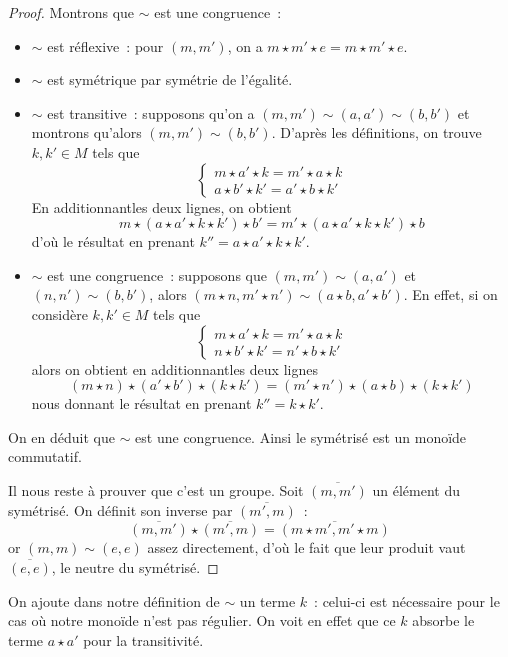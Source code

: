 \begin{proof}
  Montrons que $\sim$ est une congruence~:
  \begin{itemize}
  \item $\sim$ est réflexive~: pour $(m,m')$, on a
    $m \star m' \star e = m \star m' \star e$.
  \item $\sim$ est symétrique par symétrie de l'égalité.
  \item $\sim$ est transitive~: supposons qu'on a $(m,m')\sim (a,a')\sim(b,b')$
    et montrons qu'alors $(m,m')\sim (b,b')$. D'après les définitions, on trouve
    $k,k'\in M$ tels que
    \[\left\{\begin{array}{l}
    m \star a' \star k = m' \star a \star k\\
    a \star b' \star k' = a' \star b \star k'
    \end{array}\right.\]
    En \og additionnant\fg les deux lignes, on obtient
    \[m \star (a \star a' \star k \star k') \star b' =
    m' \star (a \star a' \star k \star k') \star b\]
    d'où le résultat en prenant $k'' = a \star a' \star k \star k'$.
  \item $\sim$ est une congruence~: supposons que $(m,m')\sim(a,a')$ et
    $(n,n')\sim(b,b')$, alors
    $(m\star n, m' \star n') \sim(a\star b,a'\star b')$. En effet, si on
    considère $k,k'\in M$ tels que
    \[\left\{\begin{array}{l}
    m \star a' \star k = m' \star a \star k\\
    n \star b' \star k' = n' \star b \star k'
    \end{array}\right.\]
    alors on obtient en \og additionnant\fg les deux lignes
    \[(m \star n) \star (a' \star b') \star (k \star k') =
    (m' \star n') \star (a \star b) \star (k \star k')\]
    nous donnant le résultat en prenant $k'' = k \star k'$.
  \end{itemize}
  On en déduit que $\sim$ est une congruence. Ainsi le symétrisé est un monoïde
  commutatif.

  Il nous reste à prouver que c'est un groupe. Soit $\overline{(m,m')}$ un
  élément du symétrisé. On définit son inverse par $\overline{(m',m)}$~:
  \[\overline{(m,m')}\star \overline{(m',m)} =
  \overline{(m\star m',m'\star m)}\]
  or $(m,m)\sim (e,e)$ assez directement, d'où le fait que leur produit vaut
  $\overline{(e,e)}$, le neutre du symétrisé.
\end{proof}

\begin{remark}
  On ajoute dans notre définition de $\sim$ un terme $k$~: celui-ci est
  nécessaire pour le cas où notre monoïde n'est pas régulier. On voit en effet
  que ce $k$ absorbe le terme $a \star a'$ pour la transitivité.
\end{remark}

